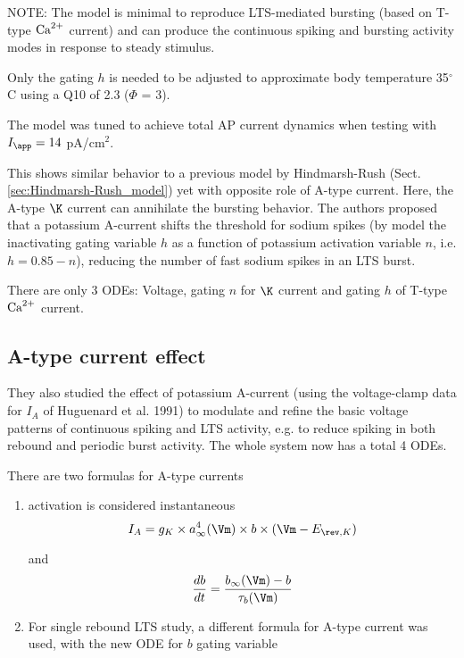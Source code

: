 NOTE: The model is minimal to reproduce LTS-mediated bursting (based on T-type
${\text{Ca}^{2+}}$ current) and can produce the continuous spiking and bursting activity
modes in response to steady stimulus.

Only the gating $h$ is needed to be adjusted to approximate
body temperature 35$^\circ$C using a Q10 of 2.3 ($\Phi$ = 3).

The model was tuned to achieve total AP current dynamics when testing with
$I_\app = 14$ pA/cm$^2$.

This shows similar behavior to a previous model by Hindmarsh-Rush
(Sect.\ref{sec:Hindmarsh-Rush_model}) yet with opposite role of A-type current.
Here, the A-type $\K$ current can annihilate the bursting behavior.
The authors proposed that a potassium A-current shifts the threshold for sodium
spikes (by model the inactivating gating variable $h$ as a function of potassium
activation variable $n$, i.e. $h=0.85-n$), reducing the number of fast sodium
spikes in an LTS burst.


There are only 3 ODEs: Voltage, gating $n$ for $\K$ current and gating $h$ of
T-type ${\text{Ca}^{2+}}$ current. 


\subsection{A-type current effect}

They also studied the effect of potassium A-current (using the voltage-clamp
data for $I_A$ of Huguenard et al. 1991) to modulate and refine the basic
voltage patterns of continuous spiking and LTS activity, e.g. to reduce spiking
in both rebound and periodic burst activity.
The whole system now has a total 4 ODEs.

There are two formulas for A-type currents
\begin{enumerate}
  \item  activation is considered instantaneous
\begin{equation}
I_A = g_K \times a_\infty^4(\Vm) \times b \times (\Vm - E_{\rev,K})
\end{equation}

and
\begin{equation}
\frac{db}{dt} = \frac{b_\infty(\Vm)  - b}{\tau_b(\Vm)}
\end{equation}

  \item  For single rebound LTS study, a different formula for A-type current
  was used, with the new ODE for $b$ gating variable


  
\end{enumerate}

